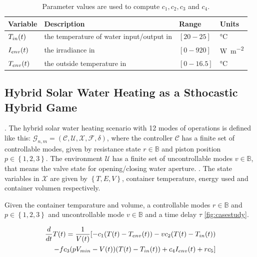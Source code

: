 \begin{table}[hbt!]
\begin{tabular}{ |p{2cm}||p{6cm}|p{2cm}|p{2cm}|  }
          \hline
          Variable& Description & Range&Units\\
          \hline
          $T_{in}(t)$ & the temperature of water input/output in & $[20-25]$ & \si{\degreeCelsius} \\
          $I_{env}(t)$ & the irradiance in & $[0-920]$ & \si{\watt\per\square\metre}    \\
          $T_{env}(t)$ & the outside temperature in & $[0-16.5]$ & \si{\degreeCelsius} \\
          \hline
      \end{tabular}
      \caption{Parameter values are used to compute $c_1,c_2, c_3$ and $c_4$.}
      \label{data-table}
      \end{table}
      \clearpage
    \subsection{Hybrid Solar Water Heating as a Sthocastic Hybrid Game}.
    The hybrid solar water heating scenario with 12 modes of operations is
    defined  like this: $\mathcal{G}_{n,m} = (\mathcal{C,U,X,F},\delta)$, 
    where the controller $\mathcal{C}$ has a finite set of controllable modes,
    given by resistance state ${r \in \mathbb{B}}$ and piston position $p \in 
    \left\lbrace1,2,3\right\rbrace $. The environment $\mathcal{U}$ has a finite  
    set of uncontrollable modes $v \in \mathbb{B} $, that means the valve state 
    for opening/closing water aperture. . 
    The state variables in $\mathcal{X}$ are given by $\left\lbrace 
    T,E,V \right\rbrace $, container temperature, energy used and container 
    volumen respectively.

    Given the container temparature and volume, a controllable modes $r \in \mathbb{B}$
    and $p \in \left\lbrace1,2,3\right\rbrace $ and uncontrollable mode
    $v \in \mathbb{B} $ and a time delay $\tau$ \autoref{fig:casestudy}.

    \begin{equation}
      \begin{aligned}
        \frac{d}{dt}T(t) = \frac{1}{V(t)} [ -c_1(T(t)-T_{env}(t))
        - v c_{2}(T(t)-T_{in}(t)) \\
        - f c_{3}(pV_{min} - V(t))(T(t)-T_{in}(t))
        + c_{4}I_{env}(t)+ 
        r c_{5} ]
      \end{aligned}
      \label{temperature-equation}
    \end{equation}

